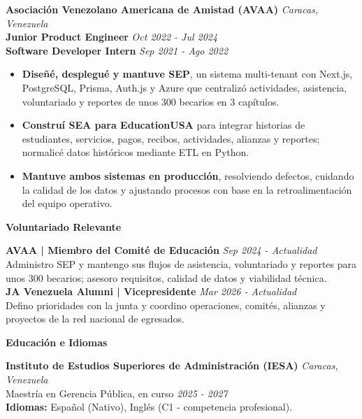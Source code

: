 \documentclass[10pt]{article}
\newcommand{\sectiontitle}[1]{%
    \vspace{4pt}
    \begin{center}
        \textbf{#1}
    \end{center}
    \vspace{-5pt}
}
\begin{document}
\vspace{2pt}
\textbf{Asociación Venezolano Americana de Amistad (AVAA)} \hfill \textit{Caracas, Venezuela} \\
\textbf{Junior Product Engineer} \hfill \textit{Oct 2022 - Jul 2024} \\
\textbf{Software Developer Intern} \hfill \textit{Sep 2021 - Ago 2022}
\begin{itemize}
    \item \textbf{Diseñé, desplegué y mantuve SEP}, un sistema multi-tenant con Next.js, PostgreSQL, Prisma, Auth.js y Azure que centralizó actividades, asistencia, voluntariado y reportes de unos 300 becarios en 3 capítulos.
    \item \textbf{Construí SEA para EducationUSA} para integrar historias de estudiantes, servicios, pagos, recibos, actividades, alianzas y reportes; normalicé datos históricos mediante ETL en Python.
    \item \textbf{Mantuve ambos sistemas en producción}, resolviendo defectos, cuidando la calidad de los datos y ajustando procesos con base en la retroalimentación del equipo operativo.
\end{itemize}

\sectiontitle{Voluntariado Relevante}
\textbf{AVAA | Miembro del Comité de Educación} \hfill \textit{Sep 2024 - Actualidad} \\
Administro SEP y mantengo sus flujos de asistencia, voluntariado y reportes para unos 300 becarios; asesoro requisitos, calidad de datos y viabilidad técnica. \\
\textbf{JA Venezuela Alumni | Vicepresidente} \hfill \textit{Mar 2026 - Actualidad} \\
Defino prioridades con la junta y coordino operaciones, comités, alianzas y proyectos de la red nacional de egresados.

\sectiontitle{Educación e Idiomas}
\textbf{Instituto de Estudios Superiores de Administración (IESA)} \hfill \textit{Caracas, Venezuela} \\
Maestría en Gerencia Pública, en curso \hfill \textit{2025 - 2027} \\
\textbf{Idiomas:} Español (Nativo), Inglés (C1 - competencia profesional).
\end{document}
